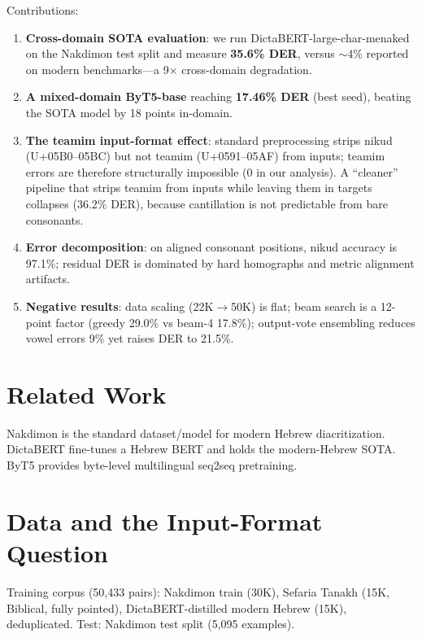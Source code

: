 \documentclass[11pt]{article}
\begin{document}
Contributions:
\begin{enumerate}
  \item \textbf{Cross-domain SOTA evaluation}: we run
        DictaBERT-large-char-menaked on the Nakdimon test split and
        measure \textbf{35.6\% DER}, versus $\sim$4\% reported on modern
        benchmarks---a 9$\times$ cross-domain degradation.
  \item \textbf{A mixed-domain ByT5-base} reaching \textbf{17.46\% DER}
        (best seed), beating the SOTA model by 18 points in-domain.
  \item \textbf{The teamim input-format effect}: standard preprocessing
        strips nikud (U+05B0--05BC) but not teamim (U+0591--05AF) from
        inputs; teamim errors are therefore structurally impossible
        (0 in our analysis). A ``cleaner'' pipeline that strips teamim
        from inputs while leaving them in targets collapses (36.2\% DER),
        because cantillation is not predictable from bare consonants.
  \item \textbf{Error decomposition}: on aligned consonant positions,
        nikud accuracy is 97.1\%; residual DER is dominated by hard
        homographs and metric alignment artifacts.
  \item \textbf{Negative results}: data scaling (22K$\to$50K) is flat;
        beam search is a 12-point factor (greedy 29.0\% vs beam-4 17.8\%);
        output-vote ensembling reduces vowel errors 9\% yet raises DER to
        21.5\%.
\end{enumerate}

\section{Related Work}
Nakdimon \cite{nakdimon} is the standard dataset/model for modern Hebrew
diacritization. DictaBERT \cite{dictabert} fine-tunes a Hebrew BERT and
holds the modern-Hebrew SOTA. ByT5 \cite{byt5} provides byte-level
multilingual seq2seq pretraining.

\section{Data and the Input-Format Question}
Training corpus (50,433 pairs): Nakdimon train (30K), Sefaria Tanakh
(15K, Biblical, fully pointed), DictaBERT-distilled modern Hebrew (15K),
deduplicated. Test: Nakdimon test split (5,095 examples).
\end{document}
